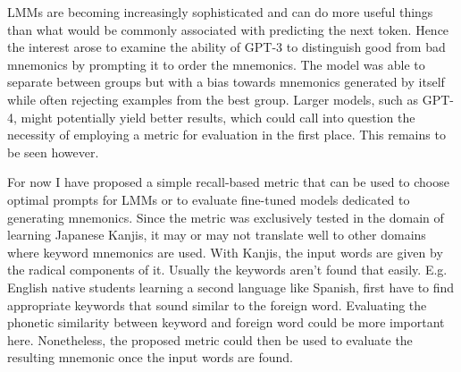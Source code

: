 LMMs are becoming increasingly sophisticated and can do more useful things than what would be commonly associated with predicting the next token. Hence the interest arose to examine the ability of GPT-3 to distinguish good from bad mnemonics by prompting it to order the mnemonics. The model was able to separate between groups but with a bias towards mnemonics generated by itself while often rejecting examples from the best group. Larger models, such as GPT-4, might potentially yield better results, which could call into question the necessity of employing a metric for evaluation in the first place. This remains to be seen however.

For now I have proposed a simple recall-based metric that can be used to choose optimal prompts for LMMs or to evaluate fine-tuned models dedicated to generating mnemonics. Since the metric was exclusively tested in the domain of learning Japanese Kanjis, it may or may not translate well to other domains where keyword mnemonics are used. With Kanjis, the input words are given by the radical components of it. Usually the keywords aren't found that easily. E.g. English native students learning a second language like Spanish, first have to find appropriate keywords that sound similar to the foreign word. Evaluating the phonetic similarity between keyword and foreign word could be more important here.
Nonetheless, the proposed metric could then be used to evaluate the resulting mnemonic once the input words are found.   


